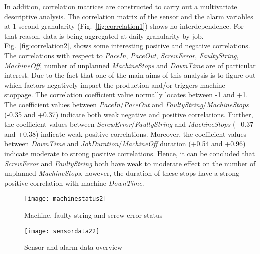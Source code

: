 \documentclass[runningheads]{llncs}
\begin{document}
In addition, correlation matrices are constructed to carry out a multivariate descriptive analysis. The correlation matrix of the sensor and the alarm variables at 1 second granularity (Fig.~\ref{fig:correlation1}) shows no interdependence. For that reason, data is being aggregated at daily granularity by job. Fig.~\ref{fig:correlation2}, shows some interesting positive and negative correlations. The correlations with respect to \emph{PaceIn}, \emph{PaceOut}, \emph{ScrewError}, \emph{FaultyString}, \emph{MachineOff}, number of unplanned \emph{MachineStops} and \emph{DownTime} are of particular interest. Due to the fact that one of the main aims of this analysis is to figure out which factors negatively impact the production and/or triggers machine stoppage. The correlation coefficient value normally locates between -1 and +1. The coefficient values between \emph{PaceIn}/\emph{PaceOut} and \emph{FaultyString}/\emph{MachineStops} (-0.35 and +0.37) indicate both weak negative and positive correlations. Further, the coefficient values between \emph{ScrewError}/\emph{FaultyString} and \emph{MachineStops} (+0.37 and +0.38) indicate weak positive correlations.  Moreover, the coefficient values  between \emph{DownTime} and \emph{JobDuration}/\emph{MachineOff} duration (+0.54 and +0.96) indicate moderate to strong positive correlations. Hence, it can be concluded that \emph{ScrewError} and \emph{FaultyString} both have weak to moderate effect on the number of unplanned \emph{MachineStops}, however, the duration of these stops have a strong positive correlation with machine \emph{DownTime}. 

\begin{figure}
\centering
\texttt{[image: machinestatus2]} 
\caption{Machine, faulty string and screw error status}
\label{fig:status}
\end{figure}


 \begin{figure}
\centering
\texttt{[image: sensordata22]} 
\caption{Sensor and alarm data overview \cite{nadeem}}
\label{fig:sensordataoverview}
\end{figure}
\end{document}
